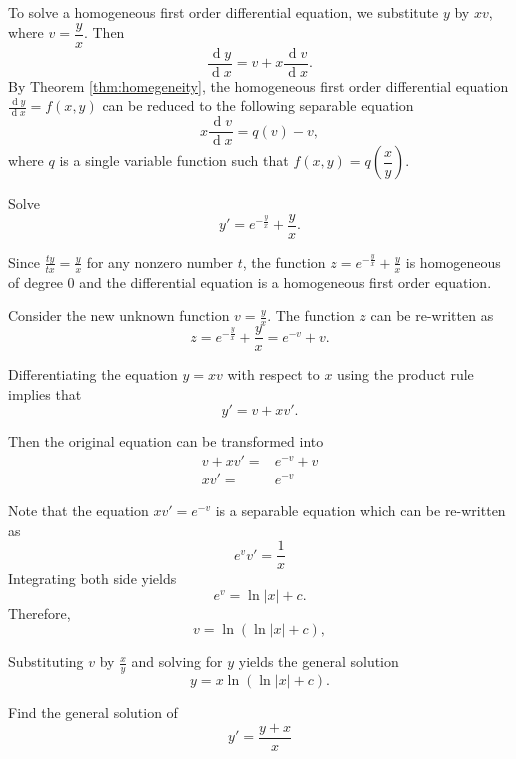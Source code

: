  To solve a homogeneous first order differential equation, we substitute $y$ by $xv$, where $v=\dfrac{y}{x}$. Then 
 \[\frac{\operatorname{d} y}{\operatorname{d} x}=v+x\frac{\operatorname{d} v}{\operatorname{d} x}.\]
 By Theorem \ref{thm:homegeneity}, the homogeneous first order differential equation $\frac{\operatorname{d} y}{\operatorname{d} x}=f(x, y)$ can be reduced to the following separable equation
 \[x\frac{\operatorname{d} v}{\operatorname{d} x}=q(v)-v,\]
 where $q$ is a single variable function such that $f(x, y)=q\left(\dfrac xy\right)$.

\begin{example}
  Solve 
  \[ y'=e^{-\frac{y}{x}}+ \frac{y}{x}.\]
\end{example}
\begin{solution}
  \begin{steps}
  \item
  Since $\frac{t y}{t x}=\frac yx$ for any nonzero number $t$, the function $z=e^{-\frac{y}{x}}+ \frac{y}{x}$ is homogeneous of degree $0$ and the differential equation is a homogeneous first order equation.
  
  \item
  Consider the new unknown function $v=\frac{y}{x}$. The function $z$ can be re-written as
  \[z=e^{-\frac{y}{x}}+ \frac{y}{x}=e^{-v}+v.\]
  
  \item Differentiating the equation $y=xv$ with respect to $x$ using the product rule implies that
   \[y'=v+xv'.\]

   \item Then the original equation can be transformed into
   \[
     \begin{aligned}
      v+xv'=&e^{-v}+v\\
      xv'=&e^{-v}
     \end{aligned}
  \]

  \item Note that the equation $xv'=e^{-v}$ is a separable equation which can be re-written as
  \[e^{v}v' = \frac{1}{x}\]
  Integrating both side yields
  \[e^{v} = \ln|x| +c.\]
  Therefore, 
  \[v= \ln(\ln |x|+c),\] 

  \item Substituting $v$ by $\frac{x}{y}$ and solving for $y$ yields the general solution
  \[y = x  \ln(\ln |x|+c).\]
\end{steps}
\end{solution}

\begin{exercise}
  Find the general solution of
  \[
  y'  =  \frac{y+x}{x}
  \]
\end{exercise}

